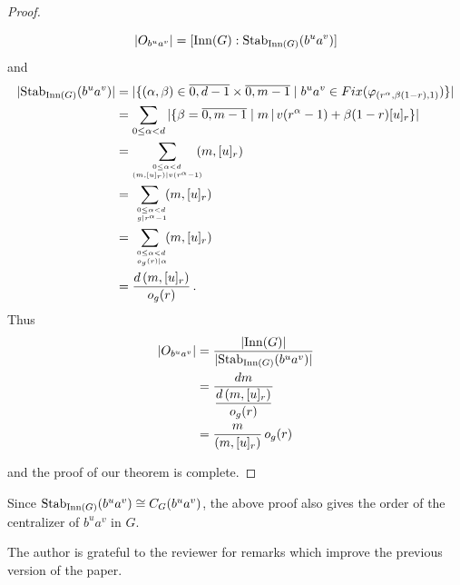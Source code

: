 \documentclass[12pt]{article}
\newcommand{\dd}{\displaystyle }
\newcommand{\0}{{\leqno}}
\begin{document}
\begin{proof}
\begin{itemize}
\begin{equation}
|O_{b^ua^v}|=[{\rm Inn}(G): {\rm Stab}_{{\rm Inn}(G)}(b^ua^v)]\vspace{-1mm}\nonumber
\end{equation}and
\begin{align*}
|{\rm Stab}_{{\rm Inn}(G)}(b^ua^v)|&=|\{(\alpha,\beta)\in\overline{0,d-1}\times\overline{0,m-1}\mid b^ua^v\in Fix(\varphi_{(r^{\alpha},\beta(1-r),1)})\}|\\
&=\dd\sum_{0\leq\alpha<d}|\{\beta=\overline{0,m-1}\mid m\,|\,v(r^{\alpha}-1)+\beta(1-r)[u]_r\}|\\
&=\dd\sum_{^{\,\,\,\,\,\,\,\,\,\,\,\,\,0\leq\alpha<d}_{(m,[u]_r)|v(r^{\alpha}-1)}}\!\!\!(m,[u]_r)\\
&=\dd\sum_{^{\,\,\,0\leq\alpha<d}_{\,\,\,g|r^{\alpha}-1}}\!(m,[u]_r)\\
&=\dd\sum_{^{\,\,\,0\leq\alpha<d}_{\,\,\,o_{g}(r)|\alpha}}\!(m,[u]_r)\\
&=\dd\frac{d\,(m,[u]_r)}{o_{g}(r)}\,.
\end{align*}Thus
\begin{align*}
|O_{b^ua^v}|&=\dd\frac{|{\rm Inn}(G)|}{|{\rm Stab}_{{\rm Inn}(G)}(b^ua^v)|}\\
&=\dd\frac{dm}{\dd\frac{d\,(m,[u]_r)}{o_{g}(r)}}\\
&=\dd\frac{m}{(m,[u]_r)}\,o_{g}(r)
\end{align*}
\end{itemize}and the proof of our theorem is complete.
\end{proof}

Since ${\rm Stab}_{{\rm Inn}(G)}(b^ua^v)\cong C_{G}(b^ua^v)$, the above proof also gives the order of the centralizer of $b^ua^v$ in $G$.
\newpage

 The author is grateful to the reviewer for remarks which improve the previous version of the paper.
\end{document}
